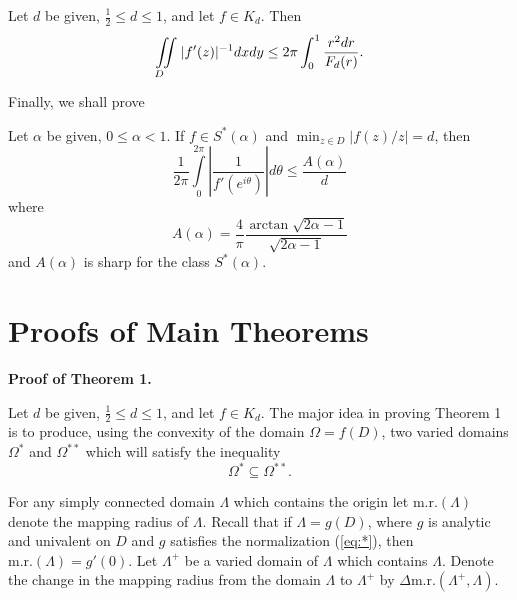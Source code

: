 \begin{theorem}\label{th:2}
Let $d$ be given, $\frac{1}{2}\leq d\leq 1$, and let $f\in K_d$.
Then
\begin{equation}
\label{eq:4}
\displaystyle{\int\hspace{-6pt}\int\hspace{-18pt}\lower
15pt\hbox{$\scriptstyle D$}\hspace{12pt}} |f'(z)|^{-1}dxdy \leq 2\pi\int^1_0
\frac{r^2dr}{F_d(r)}.
\end{equation}
\end{theorem}

Finally, we shall prove

\begin{theorem}\label{th:3}
Let $\alpha$ be given, $0\leq \alpha <1$.  If $f\in S^\ast (\alpha)$
and $\displaystyle{\min_{z\in D} |f(z)/z|=d}$, then
\begin{equation}
\label{eq;5}
\frac{1}{2\pi} \int\limits^{2\pi}_0 \left|\frac{1}{f'
(e^{i\theta})}\right| d\theta \leq \frac{A(\alpha)}{d}
\end{equation}
where
\begin{equation}
\label{eq:6}
A(\alpha)=\frac{4}{\pi} \frac{\arctan
\sqrt{2\alpha-1}}{\sqrt{2\alpha-1}}
\end{equation}
and $A(\alpha)$ is sharp for the class $S^\ast(\alpha)$.
\end{theorem}

\section{Proofs of Main Theorems}

{\bf Proof of Theorem 1.}
\vspace{12pt}

Let $d$ be given, $\frac{1}{2} \leq d \leq 1$, and let $f\in K_d$.
The major idea in proving Theorem 1 is to produce, using the
convexity of the domain $\Omega =f(D)$, two varied domains
$\Omega^\ast$ and $\Omega^{\ast\ast}$ which will satisfy the
inequality
\begin{equation}
\label{eq:7}
\Omega^\ast \subseteq \Omega^{\ast\ast}.
\end{equation}

For any simply connected domain $\Lambda$ which contains the origin
let $\mbox{m.r.}(\Lambda)$ denote the mapping radius of $\Lambda$.  Recall
that if $\Lambda = g(D)$, where $g$ is analytic and univalent on $D$
and $g$ satisfies the normalization (\ref{eq:*}), then
$\mbox{m.r.}(\Lambda)=g'(0)$. Let $\Lambda^+$ be a varied domain of
$\Lambda$ which contains $\Lambda$.  Denote the change in the mapping
radius from the domain $\Lambda$ to $\Lambda^+$ by $\Delta\mbox{m.r.}
(\Lambda^+, \Lambda)$.

